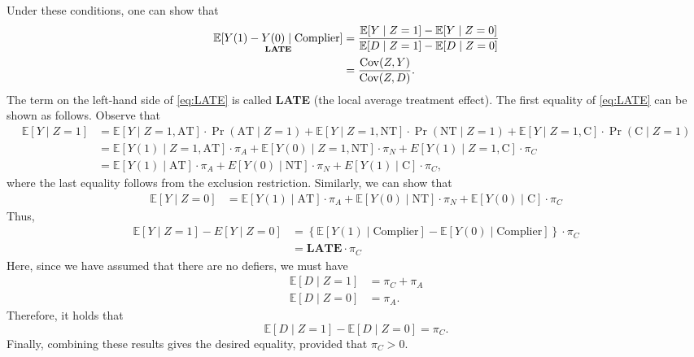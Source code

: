 \documentclass[10.5pt, A4paper, openany, uplatex]{book}
\newcommand{\mbf}{\mathbf}
\newcommand{\E}{\mathbb{E}}
\newcommand{\Cov}{\mathrm{Cov}}
\numberwithin{equation}{section}
\begin{document}
Under these conditions, one can show that
\begin{align}\label{eq:LATE}
\begin{split}
	\underset{\text{\bf LATE}}{\E[Y(1) - Y(0) \mid \text{Complier}]} 
	& = \frac{\E[Y \mid Z = 1] - \E[Y \mid Z = 0]}{\E[D \mid Z = 1] - \E[D \mid Z = 0]}\\
	& = \frac{\Cov(Z, Y)}{\Cov(Z, D)}.
\end{split}
\end{align}
The term on the left-hand side of \eqref{eq:LATE} is called \textbf{LATE} (the local average treatment effect).
The first equality of \eqref{eq:LATE} can be shown as follows.
Observe that
\small{\begin{align*}
	\E[Y \mid Z = 1 ] 
	& = \E[Y \mid Z = 1, \text{AT} ] \cdot \Pr(\text{AT} \mid Z = 1) + \E[Y \mid Z = 1, \text{NT} ] \cdot \Pr(\text{NT} \mid Z = 1) + \E[Y \mid Z = 1, \text{C} ] \cdot \Pr(\text{C} \mid Z = 1)\\
	& = \E[Y(1) \mid Z = 1, \text{AT} ] \cdot \pi_A + \E[Y(0) \mid Z = 1, \text{NT} ] \cdot \pi_N + E[Y(1) \mid Z = 1, \text{C} ] \cdot \pi_C\\
	& = \E[Y(1) \mid \text{AT} ] \cdot \pi_A  + E[Y(0) \mid \text{NT} ] \cdot \pi_N  + E[Y(1) \mid \text{C} ] \cdot \pi_C,
\end{align*}}
\normalsize
where the last equality follows from the exclusion restriction.
Similarly, we can show that
\begin{align*}
	\E[Y \mid Z = 0]
	& = \E[Y(1) \mid \text{AT} ] \cdot \pi_A + \E[ Y(0) \mid \text{NT} ] \cdot \pi_N  + \E[ Y(0) \mid \text{C} ]  \cdot \pi_C
\end{align*}
Thus, 
\begin{align*}
	\E [ Y \mid Z = 1 ] - E[ Y \mid Z = 0 ] 
	&= \left\{ \E[ Y(1) \mid \text{Complier} ] - \E[ Y(0) \mid \text{Complier} ] \right\} \cdot \pi_C\\
	& = \mbf{LATE}\cdot\pi_C
\end{align*}
Here, since we have assumed that there are no defiers, we must have
\begin{align*}
	\E[ D \mid Z = 1 ]   &  = \pi_C + \pi_A \\
	\E[ D \mid Z = 0 ]   &  = \pi_A.
\end{align*}
Therefore, it holds that
\begin{equation*}
	\E [D \mid Z = 1 ] - \E[ D \mid Z = 0 ] = \pi_C.
\end{equation*}
Finally, combining these results gives the desired equality, provided that $\pi_C > 0$.
\end{document}
